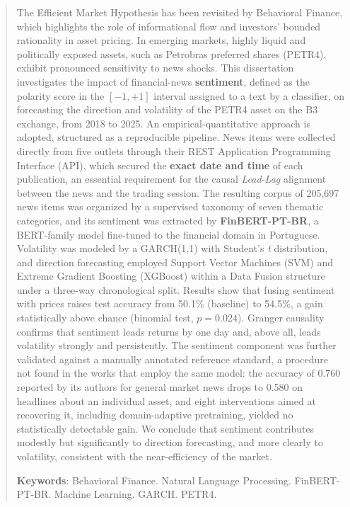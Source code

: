 \begin{abstract}
The Efficient Market Hypothesis has been revisited by Behavioral Finance, which highlights the role of informational flow and investors' bounded rationality in asset pricing. In emerging markets, highly liquid and politically exposed assets, such as Petrobras preferred shares (PETR4), exhibit pronounced sensitivity to news shocks. This dissertation investigates the impact of financial-news \textbf{sentiment}, defined as the polarity score in the $[-1,+1]$ interval assigned to a text by a classifier, on forecasting the direction and volatility of the PETR4 asset on the B3 exchange, from 2018 to 2025. An empirical-quantitative approach is adopted, structured as a reproducible pipeline. News items were collected directly from five outlets through their REST Application Programming Interface (API), which secured the \textbf{exact date and time} of each publication, an essential requirement for the causal \textit{Lead-Lag} alignment between the news and the trading session. The resulting corpus of 205,697 news items was organized by a supervised taxonomy of seven thematic categories, and its sentiment was extracted by \textbf{FinBERT-PT-BR}, a BERT-family model fine-tuned to the financial domain in Portuguese. Volatility was modeled by a GARCH(1,1) with Student's \textit{t} distribution, and direction forecasting employed Support Vector Machines (SVM) and Extreme Gradient Boosting (XGBoost) within a Data Fusion structure under a three-way chronological split. Results show that fusing sentiment with prices raises test accuracy from 50.1\% (baseline) to 54.5\%, a gain statistically above chance (binomial test, $p=0.024$). Granger causality confirms that sentiment leads returns by one day and, above all, leads volatility strongly and persistently. The sentiment component was further validated against a manually annotated reference standard, a procedure not found in the works that employ the same model: the accuracy of 0.760 reported by its authors for general market news drops to 0.580 on headlines about an individual asset, and eight interventions aimed at recovering it, including domain-adaptive pretraining, yielded no statistically detectable gain. We conclude that sentiment contributes modestly but significantly to direction forecasting, and more clearly to volatility, consistent with the near-efficiency of the market.

\vspace{\onelineskip}
\noindent
\textbf{Keywords}: Behavioral Finance. Natural Language Processing. FinBERT-PT-BR. Machine Learning. GARCH. PETR4.
\end{abstract}
